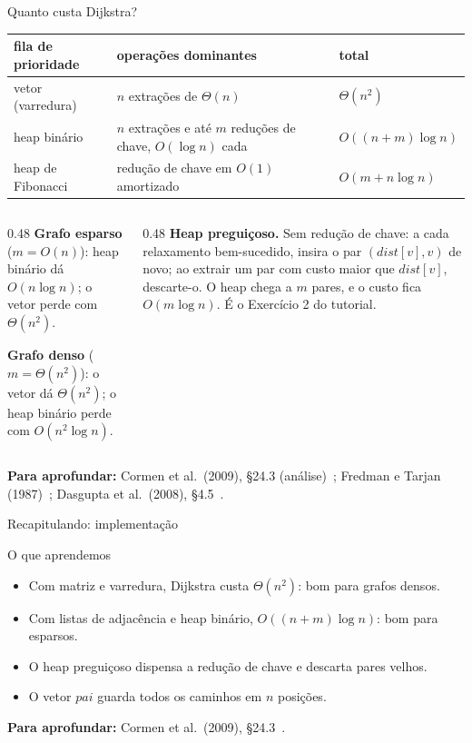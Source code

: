 \documentclass[aspectratio=169,xcolor=table]{beamer}
\newcommand{\fonte}[1]{%
  \vfill
  {\tiny\color{gray!55!black}\textbf{Para aprofundar:} #1\par}%
}
\begin{document}
\begin{frame}{Quanto custa Dijkstra?}
  \begin{center}
  \scriptsize
  \begin{tabular}{lll}
    \toprule
    fila de prioridade & operações dominantes & total \\
    \midrule
    vetor (varredura) & $n$ extrações de $\Theta(n)$ & $\Theta(n^2)$ \\
    heap binário & $n$ extrações e até $m$ reduções de chave, $O(\log n)$ cada & $O((n + m) \log n)$ \\
    heap de Fibonacci & redução de chave em $O(1)$ amortizado & $O(m + n \log n)$ \\
    \bottomrule
  \end{tabular}
  \end{center}
  \medskip
  \begin{columns}[T]
    \begin{column}{0.48\textwidth}
      \scriptsize
      \textbf{Grafo esparso} ($m = O(n)$): heap binário dá $O(n \log n)$; o vetor perde com
      $\Theta(n^2)$.
      \medskip

      \textbf{Grafo denso} ($m = \Theta(n^2)$): o vetor dá $\Theta(n^2)$; o heap binário
      perde com $O(n^2 \log n)$.
    \end{column}
    \begin{column}{0.48\textwidth}
      \scriptsize
      \textbf{Heap preguiçoso.} Sem redução de chave: a cada relaxamento bem-sucedido, insira
      o par $(\mathit{dist}[v], v)$ de novo; ao extrair um par com custo maior que
      $\mathit{dist}[v]$, descarte-o. O heap chega a $m$ pares, e o custo fica
      $O(m \log n)$. É o Exercício 2 do tutorial.
    \end{column}
  \end{columns}
  \fonte{Cormen et al.\ (2009), \S 24.3 (análise)~\cite{cormen2009introduction};
    Fredman e Tarjan (1987)~\cite{fredman1987fibonacci}; Dasgupta et al.\ (2008),
    \S 4.5~\cite{dasgupta2008algorithms}.}
\end{frame}

\begin{frame}{Recapitulando: implementação}
  \begin{block}{O que aprendemos}
    \begin{itemize}
      \item Com matriz e varredura, Dijkstra custa $\Theta(n^2)$: bom para grafos densos.
      \item Com listas de adjacência e heap binário, $O((n + m) \log n)$: bom para esparsos.
      \item O heap preguiçoso dispensa a redução de chave e descarta pares velhos.
      \item O vetor $\mathit{pai}$ guarda todos os caminhos em $n$ posições.
    \end{itemize}
  \end{block}
  \fonte{Cormen et al.\ (2009), \S 24.3~\cite{cormen2009introduction}.}
\end{frame}
\end{document}
